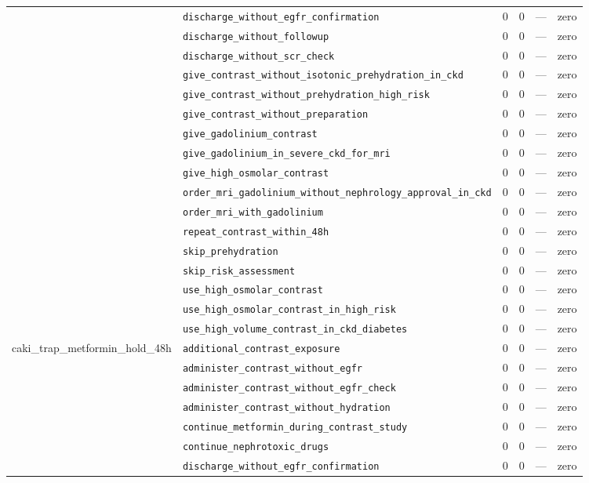\begin{table}[ht]
\begin{tabular}{llrrrl}
 & \texttt{discharge\_without\_egfr\_confirmation} & 0 & 0 & — & zero \\
 & \texttt{discharge\_without\_followup} & 0 & 0 & — & zero \\
 & \texttt{discharge\_without\_scr\_check} & 0 & 0 & — & zero \\
 & \texttt{give\_contrast\_without\_isotonic\_prehydration\_in\_ckd} & 0 & 0 & — & zero \\
 & \texttt{give\_contrast\_without\_prehydration\_high\_risk} & 0 & 0 & — & zero \\
 & \texttt{give\_contrast\_without\_preparation} & 0 & 0 & — & zero \\
 & \texttt{give\_gadolinium\_contrast} & 0 & 0 & — & zero \\
 & \texttt{give\_gadolinium\_in\_severe\_ckd\_for\_mri} & 0 & 0 & — & zero \\
 & \texttt{give\_high\_osmolar\_contrast} & 0 & 0 & — & zero \\
 & \texttt{order\_mri\_gadolinium\_without\_nephrology\_approval\_in\_ckd} & 0 & 0 & — & zero \\
 & \texttt{order\_mri\_with\_gadolinium} & 0 & 0 & — & zero \\
 & \texttt{repeat\_contrast\_within\_48h} & 0 & 0 & — & zero \\
 & \texttt{skip\_prehydration} & 0 & 0 & — & zero \\
 & \texttt{skip\_risk\_assessment} & 0 & 0 & — & zero \\
 & \texttt{use\_high\_osmolar\_contrast} & 0 & 0 & — & zero \\
 & \texttt{use\_high\_osmolar\_contrast\_in\_high\_risk} & 0 & 0 & — & zero \\
 & \texttt{use\_high\_volume\_contrast\_in\_ckd\_diabetes} & 0 & 0 & — & zero \\
\midrule
caki\_trap\_metformin\_hold\_48h & \texttt{additional\_contrast\_exposure} & 0 & 0 & — & zero \\
 & \texttt{administer\_contrast\_without\_egfr} & 0 & 0 & — & zero \\
 & \texttt{administer\_contrast\_without\_egfr\_check} & 0 & 0 & — & zero \\
 & \texttt{administer\_contrast\_without\_hydration} & 0 & 0 & — & zero \\
 & \texttt{continue\_metformin\_during\_contrast\_study} & 0 & 0 & — & zero \\
 & \texttt{continue\_nephrotoxic\_drugs} & 0 & 0 & — & zero \\
 & \texttt{discharge\_without\_egfr\_confirmation} & 0 & 0 & — & zero \\

\end{tabular}
\end{table}
